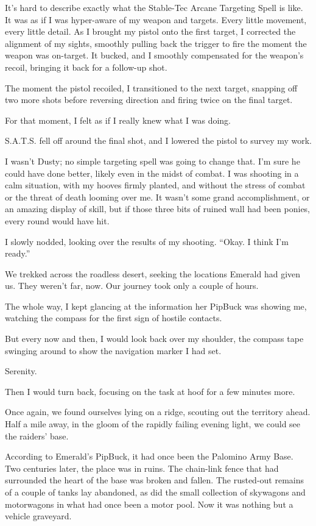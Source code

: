 It’s hard to describe exactly what the Stable-Tec Arcane Targeting Spell is like. It was as if I was hyper-aware of my weapon and targets. Every little movement, every little detail. As I brought my pistol onto the first target, I corrected the alignment of my sights, smoothly pulling back the trigger to fire the moment the weapon was on-target. It bucked, and I smoothly compensated for the weapon’s recoil, bringing it back for a follow-up shot.

The moment the pistol recoiled, I transitioned to the next target, snapping off two more shots before reversing direction and firing twice on the final target.

For that moment, I felt as if I really knew what I was doing.

S.A.T.S. fell off around the final shot, and I lowered the pistol to survey my work.

I wasn’t Dusty; no simple targeting spell was going to change that. I’m sure he could have done better, likely even in the midst of combat. I was shooting in a calm situation, with my hooves firmly planted, and without the stress of combat or the threat of death looming over me. It wasn’t some grand accomplishment, or an amazing display of skill, but if those three bits of ruined wall had been ponies, every round would have hit.

I slowly nodded, looking over the results of my shooting. “Okay. I think I’m ready.”

{\br}%
We trekked across the roadless desert, seeking the locations Emerald had given us. They weren’t far, now. Our journey took only a couple of hours.

The whole way, I kept glancing at the information her PipBuck was showing me, watching the compass for the first sign of hostile contacts.

But every now and then, I would look back over my shoulder, the compass tape swinging around to show the navigation marker I had set.

Serenity.

Then I would turn back, focusing on the task at hoof for a few minutes more.

{\br}%
Once again, we found ourselves lying on a ridge, scouting out the territory ahead. Half a mile away, in the gloom of the rapidly failing evening light, we could see the raiders’ base.

According to Emerald’s PipBuck, it had once been the Palomino Army Base. Two centuries later, the place was in ruins. The chain-link fence that had surrounded the heart of the base was broken and fallen. The rusted-out remains of a couple of tanks lay abandoned, as did the small collection of skywagons and motorwagons in what had once been a motor pool. Now it was nothing but a vehicle graveyard.

